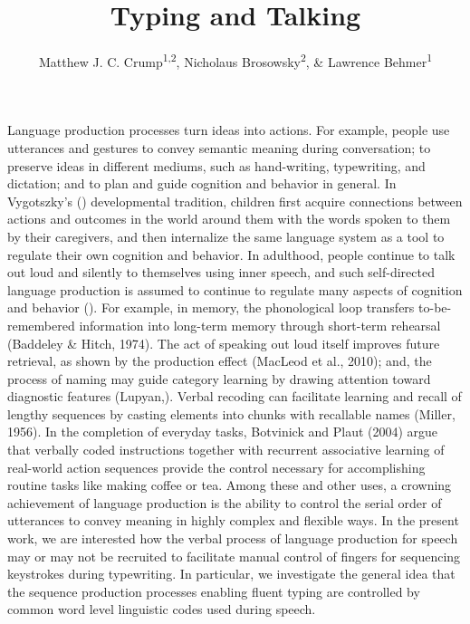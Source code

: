 \documentclass[floatsintext,man]{apa6}
\title{Typing and Talking}
\author{Matthew J. C. Crump\textsuperscript{1,2}, Nicholaus Brosowsky\textsuperscript{2}, \& Lawrence Behmer\textsuperscript{1}}
\affiliation{
    \vspace{0.5cm}
          \textsuperscript{1} Brooklyn College of the City University of New York\\
          \textsuperscript{2} Graduate Center of the City University of New York  }
\theoremstyle{definition}
\theoremstyle{definition}
\theoremstyle{definition}
\theoremstyle{remark}
\begin{document}
\maketitle

\setcounter{secnumdepth}{0}



Language production processes turn ideas into actions. For example,
people use utterances and gestures to convey semantic meaning during
conversation; to preserve ideas in different mediums, such as
hand-writing, typewriting, and dictation; and to plan and guide
cognition and behavior in general. In Vygotszky's () developmental
tradition, children first acquire connections between actions and
outcomes in the world around them with the words spoken to them by their
caregivers, and then internalize the same language system as a tool to
regulate their own cognition and behavior. In adulthood, people continue
to talk out loud and silently to themselves using inner speech, and such
self-directed language production is assumed to continue to regulate
many aspects of cognition and behavior (). For example, in memory, the
phonological loop transfers to-be-remembered information into long-term
memory through short-term rehearsal (Baddeley \& Hitch, 1974). The act
of speaking out loud itself improves future retrieval, as shown by the
production effect (MacLeod et al., 2010); and, the process of naming may
guide category learning by drawing attention toward diagnostic features
(Lupyan,). Verbal recoding can facilitate learning and recall of lengthy
sequences by casting elements into chunks with recallable names (Miller,
1956). In the completion of everyday tasks, Botvinick and Plaut (2004)
argue that verbally coded instructions together with recurrent
associative learning of real-world action sequences provide the control
necessary for accomplishing routine tasks like making coffee or tea.
Among these and other uses, a crowning achievement of language
production is the ability to control the serial order of utterances to
convey meaning in highly complex and flexible ways. In the present work,
we are interested how the verbal process of language production for
speech may or may not be recruited to facilitate manual control of
fingers for sequencing keystrokes during typewriting. In particular, we
investigate the general idea that the sequence production processes
enabling fluent typing are controlled by common word level linguistic
codes used during speech.
\end{document}
